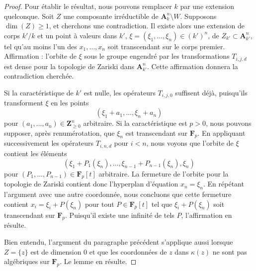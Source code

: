 \begin{proof}
Pour établir le résultat, nous pouvons remplacer $k$ par une extension
quelconque. Soit $Z$ une composante irréductible de
$\mathbf{A}^n_k \setminus W$. Supposons $\dim(Z) \geq 1$, et cherchons une
contradiction. Il existe alors une extension de corps $k'/k$ et un point à
valeurs dans $k'$, $\xi = (\xi_1, \ldots, \xi_n) \in (k')^n$, de
$Z_{k'} \subset \mathbf{A}^n_{k'}$, tel qu'au moins l'un des
$x_1, \ldots, x_n$ soit transcendant sur le corps premier. Affirmation :
l'orbite de $\xi$ sous le groupe engendré par les transformations
$T_{i, j, d}$ est dense pour la topologie de Zariski dans
$\mathbf{A}^n_{k'}$. Cette affirmation donnera la contradiction cherchée.

\medskip\noindent
Si la caractéristique de $k'$ est nulle, les opérateurs $T_{i, j, 0}$
suffisent déjà, puisqu'ils transforment $\xi$ en les points
$$
(\xi_1 + a_1, \ldots, \xi_n + a_n)
$$
pour $(a_1, \ldots, a_n) \in \mathbf{Z}_{\geq 0}^n$ arbitraire. Si la
caractéristique est $p > 0$, nous pouvons supposer, après renumérotation, que
$\xi_n$ est transcendant sur $\mathbf{F}_p$. En appliquant successivement les
opérateurs $T_{i, n, d}$ pour $i < n$, nous voyons que l'orbite de $\xi$
contient les éléments
$$
(\xi_1 + P_1(\xi_n), \ldots, \xi_{n - 1} + P_{n - 1}(\xi_n), \xi_n)
$$
pour $(P_1, \ldots, P_{n - 1}) \in \mathbf{F}_p[t]$ arbitraire. La fermeture
de l'orbite pour la topologie de Zariski contient donc l'hyperplan d'équation
$x_n = \xi_n$. En répétant l'argument avec une autre coordonnée, nous
concluons que cette fermeture contient $x_i = \xi_i + P(\xi_n)$ pour tout
$P \in \mathbf{F}_p[t]$ tel que $\xi_i + P(\xi_n)$ soit transcendant sur
$\mathbf{F}_p$. Puisqu'il existe une infinité de tels $P$, l'affirmation en
résulte.

\medskip\noindent
Bien entendu, l'argument du paragraphe précédent s'applique aussi lorsque
$Z = \{z\}$ est de dimension $0$ et que les coordonnées de $z$ dans
$\kappa(z)$ ne sont pas algébriques sur $\mathbf{F}_p$. Le lemme en résulte.
\end{proof}

